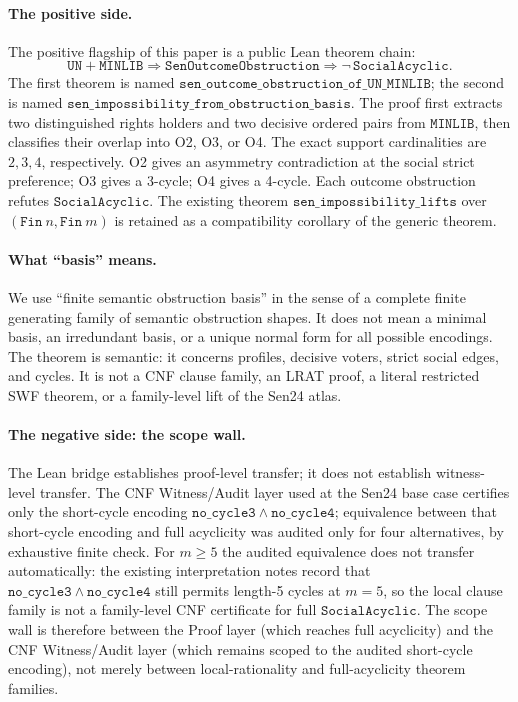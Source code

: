 \paragraph{The positive side.}
The positive flagship of this paper is a public Lean theorem chain:
\[
\mathtt{UN} + \mathtt{MINLIB}
  \Longrightarrow
\mathtt{SenOutcomeObstruction}
  \Longrightarrow
\neg\,\mathtt{SocialAcyclic}.
\]
The first theorem is named \(\mathtt{sen\_outcome\_obstruction\_of\_UN\_MINLIB}\);
the second is named \(\mathtt{sen\_impossibility\_from\_obstruction\_basis}\).
The proof first extracts two distinguished rights holders and two decisive ordered pairs from \(\mathtt{MINLIB}\), then classifies their overlap into O2, O3, or O4.
The exact support cardinalities are \(2,3,4\), respectively.
O2 gives an asymmetry contradiction at the social strict preference; O3 gives a 3-cycle; O4 gives a 4-cycle.
Each outcome obstruction refutes \(\mathtt{SocialAcyclic}\).
The existing theorem \(\mathtt{sen\_impossibility\_lifts}\) over \((\mathtt{Fin}\ n,\mathtt{Fin}\ m)\) is retained as a compatibility corollary of the generic theorem.

\paragraph{What ``basis'' means.}
We use ``finite semantic obstruction basis'' in the sense of a complete finite generating family of semantic obstruction shapes.
It does not mean a minimal basis, an irredundant basis, or a unique normal form for all possible encodings.
The theorem is semantic: it concerns profiles, decisive voters, strict social edges, and cycles.
It is not a CNF clause family, an LRAT proof, a literal restricted SWF theorem, or a family-level lift of the Sen24 atlas.

\paragraph{The negative side: the scope wall.}
The Lean bridge establishes proof-level transfer; it does not establish witness-level transfer.
The CNF Witness/Audit layer used at the Sen24 base case certifies only the short-cycle encoding \(\mathtt{no\_cycle3 \wedge no\_cycle4}\); equivalence between that short-cycle encoding and full acyclicity was audited only for four alternatives, by exhaustive finite check.
For \(m \geq 5\) the audited equivalence does not transfer automatically: the existing interpretation notes record that \(\mathtt{no\_cycle3 \wedge no\_cycle4}\) still permits length-5 cycles at \(m=5\), so the local clause family is not a family-level CNF certificate for full \(\mathtt{SocialAcyclic}\).
The scope wall is therefore between the Proof layer (which reaches full acyclicity) and the CNF Witness/Audit layer (which remains scoped to the audited short-cycle encoding), not merely between local-rationality and full-acyclicity theorem families.

